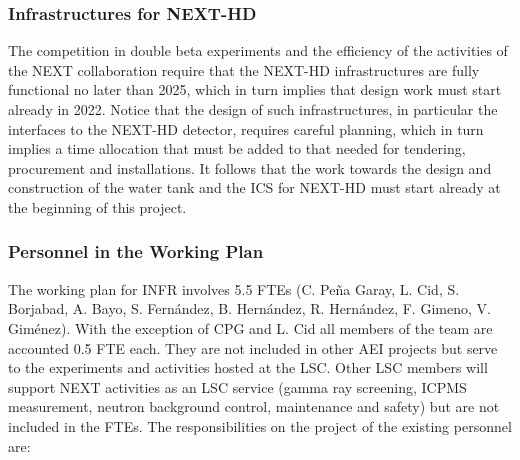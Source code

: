 \subsubsection*{Infrastructures for NEXT-HD}

The competition in double beta experiments and the efficiency of the activities of the NEXT collaboration require that the NEXT-HD infrastructures are fully functional no later than 2025, which in turn implies that design work must start already in 2022.  Notice that 
the design of such infrastructures, in particular the interfaces to the NEXT-HD detector, requires careful planning, which in turn implies a time allocation that must be added to that needed for tendering, procurement and installations. It follows that the work towards the 
design and construction of the water tank and the ICS for NEXT-HD must start already at the beginning of this project.  

\subsubsection*{Personnel in the Working Plan}

The working plan for INFR involves 5.5 FTEs (C. Pe\~na Garay, L. Cid, S. Borjabad, A. Bayo, S. Fern\'andez, B. Hern\'andez,
R. Hern\'andez, F. Gimeno, V. Gim\'enez). With the exception of CPG and L. Cid  all members of the team are accounted 0.5 FTE 
each. They are not included in other AEI projects but serve to the experiments and activities hosted at the LSC. Other LSC members 
will support NEXT activities as an LSC service (gamma ray screening, ICPMS measurement, neutron background control, maintenance 
and safety) but are not included in the FTEs. The responsibilities on the project of the existing personnel are:

